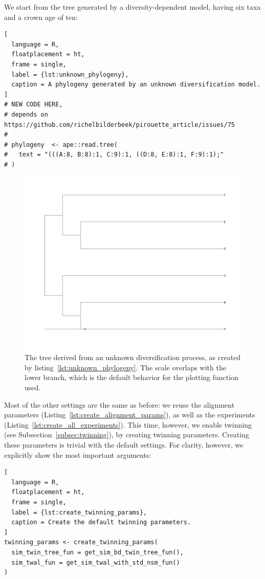 We start from the tree generated by a diversity-dependent model,
having six taxa and a crown age of ten:
\begin{lstlisting}[
  language = R, 
  floatplacement = ht,
  frame = single, 
  label = {lst:unknown_phylogeny},
  caption = A phylogeny generated by an unknown diversification model.
]
# NEW CODE HERE, 
# depends on https://github.com/richelbilderbeek/pirouette_article/issues/75
#
# phylogeny  <- ape::read.tree(
#   text = "(((A:8, B:8):1, C:9):1, ((D:8, E:8):1, F:9):1);"
# )
\end{lstlisting}
\begin{figure}[H]
  \includegraphics[width=\textwidth]{pirouette_example_3/example_3_314/true_tree.png}
  \caption{The tree derived from an unknown diversification process, 
    as created by listing~\ref{lst:unknown_phylogeny}.
    The scale overlaps with the lower branch, which is the default 
    behavior for the plotting function used.
  }
\end{figure}

Most of the other settings are the same as before: 
we reuse the alignment parameters (Listing~\ref{lst:create_alignment_params}), 
as well as the experiments (Listing~\ref{lst:create_all_experiments}).
This time, however, we enable twinning (see Subsection~\ref{subsec:twinning}),
by creating twinning parameters.
Creating these parameters is trivial with the default settings.
For clarity, however, we explicitly show the most important arguments:

\begin{lstlisting}[
  language = R,
  floatplacement = ht,
  frame = single,
  label = {lst:create_twinning_params},
  caption = Create the default twinning parameters.
]
twinning_params <- create_twinning_params(
  sim_twin_tree_fun = get_sim_bd_twin_tree_fun(),
  sim_twal_fun = get_sim_twal_with_std_nsm_fun()
)
\end{lstlisting}

